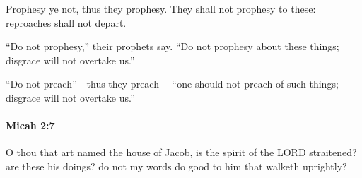 			\begin{versebox}
					\item[BHS] 
					\item[LXX] 
					\item[ASV] Prophesy ye not, thus they prophesy. They shall not prophesy to these: reproaches shall not depart.
					\item[NIV] “Do not prophesy,” their prophets say. “Do not prophesy about these things; disgrace will not overtake us.”
					\item[NRSV] “Do not preach”—thus they preach— “one should not preach of such things; disgrace will not overtake us.”
			\end{versebox}

		\paragraph{Micah 2:7} %
			\label{MICAH-2-7}

			O thou that art named the house of Jacob, is the spirit of the LORD straitened? are these his doings? do not my words do good to him that walketh uprightly?


